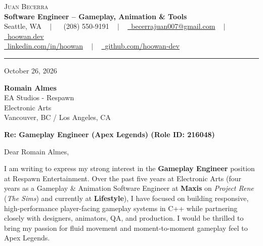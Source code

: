 \documentclass[letterpaper,11pt]{article}
\begin{document}
\begin{center}
    {\Huge \scshape Juan Becerra} \\ \vspace{4pt}
    \textbf{\large Software Engineer -- Gameplay, Animation \& Tools} \\ \vspace{4pt}
    \small Seattle, WA ~ $|$ ~
    \raisebox{-0.1\height}\faPhone\ (208) 550-9191 ~ $|$ ~
    \href{mailto:becerrajuan007@gmail.com}{\raisebox{-0.2\height}\faEnvelope\ \underline{becerrajuan007@gmail.com}} ~ $|$ ~
    \href{https://hoowan.dev}{\raisebox{-0.2\height}\faGlobe\ \underline{hoowan.dev}} \\ \vspace{2pt}
    \href{https://linkedin.com/in/hoowan/}{\raisebox{-0.2\height}\faLinkedin\ \underline{linkedin.com/in/hoowan}} ~ $|$ ~
    \href{https://github.com/hoowan-dev}{\raisebox{-0.2\height}\faGithub\ \underline{github.com/hoowan-dev}}
\end{center}

\vspace{4pt}
\hrule
\vspace{14pt}

\noindent October 26, 2026

\vspace{8pt}
\noindent \textbf{Romain Almes} \\
EA Studios - Respawn \\
Electronic Arts \\
Vancouver, BC / Los Angeles, CA

\vspace{8pt}
\noindent \textbf{Re: Gameplay Engineer (Apex Legends) (Role ID: 216048)}

\vspace{8pt}
\noindent Dear Romain Almes,

I am writing to express my strong interest in the \textbf{Gameplay Engineer} position at Respawn 
Entertainment. Over the past five years at Electronic Arts (four years as a Gameplay \& Animation 
Software Engineer at \textbf{Maxis} on \emph{Project Rene} (\emph{The Sims}) and currently at 
\textbf{Lifestyle}), I have focused on building responsive, high-performance player-facing gameplay 
systems in C++ while partnering closely with designers, animators, QA, and production. I would be 
thrilled to bring my passion for fluid movement and moment-to-moment gameplay feel to Apex Legends.
\end{document}
